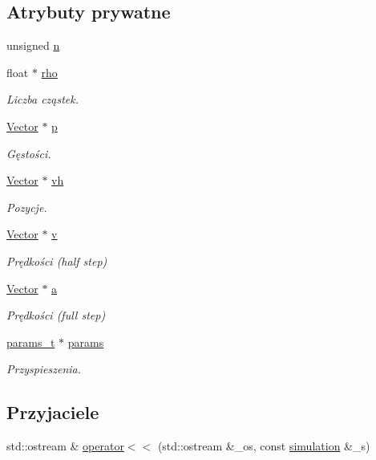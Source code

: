 \subsection*{Atrybuty prywatne}
\begin{DoxyCompactItemize}
\item 
unsigned \hyperlink{classsimulation_a22eb97765a5c60adf3d995f7a110da70}{n}
\item 
float $\ast$ \hyperlink{classsimulation_a44081d4edd92e17a3e1067b976031a00}{rho}
\begin{DoxyCompactList}\small\item\em Liczba cząstek. \end{DoxyCompactList}\item 
\hyperlink{class_vector}{Vector} $\ast$ \hyperlink{classsimulation_a5412fd01febe99f12ae38e30eb692ff0}{p}
\begin{DoxyCompactList}\small\item\em Gęstości. \end{DoxyCompactList}\item 
\hyperlink{class_vector}{Vector} $\ast$ \hyperlink{classsimulation_ae6da1f15728f49be7b0793700866ede9}{vh}
\begin{DoxyCompactList}\small\item\em Pozycje. \end{DoxyCompactList}\item 
\hyperlink{class_vector}{Vector} $\ast$ \hyperlink{classsimulation_a39dbad79b1b8667840638a35e839a3f7}{v}
\begin{DoxyCompactList}\small\item\em Prędkości (half step) \end{DoxyCompactList}\item 
\hyperlink{class_vector}{Vector} $\ast$ \hyperlink{classsimulation_a7b5ca0e5fc096989be7966a73c360b7f}{a}
\begin{DoxyCompactList}\small\item\em Prędkości (full step) \end{DoxyCompactList}\item 
\hyperlink{structparams__t}{params\-\_\-t} $\ast$ \hyperlink{classsimulation_a861b82cc3c0e7e58abfba464a133dae3}{params}
\begin{DoxyCompactList}\small\item\em Przyspieszenia. \end{DoxyCompactList}\end{DoxyCompactItemize}
\subsection*{Przyjaciele}
\begin{DoxyCompactItemize}
\item 
std\-::ostream \& \hyperlink{classsimulation_a1f6414b078a2823f5cea77fc1235e1d9}{operator$<$$<$} (std\-::ostream \&\-\_\-os, const \hyperlink{classsimulation}{simulation} \&\-\_\-s)
\end{DoxyCompactItemize}


